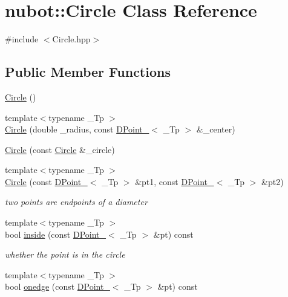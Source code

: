 \hypertarget{classnubot_1_1Circle}{\section{nubot\-:\-:Circle Class Reference}
\label{classnubot_1_1Circle}
}


{\ttfamily \#include $<$Circle.\-hpp$>$}

\subsection*{Public Member Functions}
\begin{DoxyCompactItemize}
\item 
\hyperlink{classnubot_1_1Circle_a6fcb5d5835ad8c86696ce21948609270}{Circle} ()
\item 
{\footnotesize template$<$typename \-\_\-\-Tp $>$ }\\\hyperlink{classnubot_1_1Circle_a7b9e93757d174a530119510ea4f5f09f}{Circle} (double \-\_\-radius, const \hyperlink{classnubot_1_1DPoint__}{D\-Point\-\_\-}$<$ \-\_\-\-Tp $>$ \&\-\_\-center)
\item 
\hyperlink{classnubot_1_1Circle_aee5aa88389a236d017bc42dff3bc5b4f}{Circle} (const \hyperlink{classnubot_1_1Circle}{Circle} \&\-\_\-circle)
\item 
{\footnotesize template$<$typename \-\_\-\-Tp $>$ }\\\hyperlink{classnubot_1_1Circle_a575a6adbfd11e44614c53e4db663d2fc}{Circle} (const \hyperlink{classnubot_1_1DPoint__}{D\-Point\-\_\-}$<$ \-\_\-\-Tp $>$ \&pt1, const \hyperlink{classnubot_1_1DPoint__}{D\-Point\-\_\-}$<$ \-\_\-\-Tp $>$ \&pt2)
\begin{DoxyCompactList}\small\item\em two points are endpoints of a diameter \end{DoxyCompactList}\item 
{\footnotesize template$<$typename \-\_\-\-Tp $>$ }\\bool \hyperlink{classnubot_1_1Circle_a221e2537db4f65da3462eca1374070d0}{inside} (const \hyperlink{classnubot_1_1DPoint__}{D\-Point\-\_\-}$<$ \-\_\-\-Tp $>$ \&pt) const 
\begin{DoxyCompactList}\small\item\em whether the point is in the circle \end{DoxyCompactList}\item 
{\footnotesize template$<$typename \-\_\-\-Tp $>$ }\\bool \hyperlink{classnubot_1_1Circle_a27c663258243e156860092eb648e6eb1}{onedge} (const \hyperlink{classnubot_1_1DPoint__}{D\-Point\-\_\-}$<$ \-\_\-\-Tp $>$ \&pt) const 

\end{DoxyCompactItemize}

